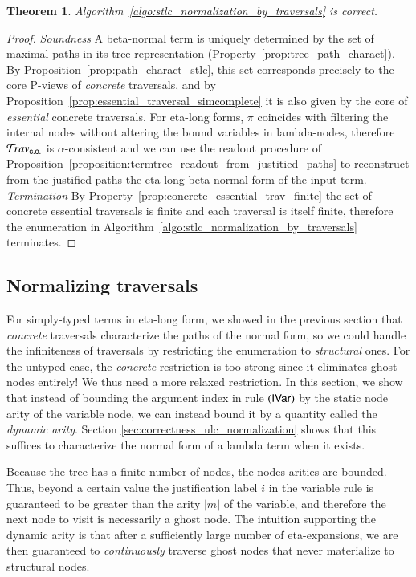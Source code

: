 \documentclass{elsarticle}
\newif\iflongversion
\theoremstyle{plain}
\newtheorem{theorem}{Theorem}[section]
\theoremstyle{definition}
\newcommand{\ghostvar}{\mathsf{x\mkern-5mu x}}
\newcommand{\concreteessential}{{\sf c.e.}}
\newcommand{\travsetcones}{\travset_\concreteessential} %
\def\coresymbol{\pi} %
\begin{document}
\begin{theorem}
Algorithm~\ref{algo:stlc_normalization_by_traversals} is correct.
\end{theorem}
\begin{proof}
\emph{Soundness} A beta-normal term is uniquely determined by the set of maximal paths in its tree representation (Property~\ref{prop:tree_path_charact}).
By Proposition~\ref{prop:path_charact_stlc}, this set corresponds precisely to the core P-views of \emph{concrete} traversals,
and by Proposition~\ref{prop:essential_traversal_simcomplete} it is also given by the core of \emph{essential} concrete traversals.
For eta-long forms, $\coresymbol$ coincides with filtering the internal nodes without altering the bound variables in lambda-nodes, therefore $\travsetcones$ is $\alpha$-consistent and we can use the
readout procedure of Proposition~\ref{proposition:termtree_readout_from_justitied_paths} to reconstruct
from the justified paths the
eta-long beta-normal form of the input term.
%
\emph{Termination} By Property~\ref{prop:concrete_essential_trav_finite} the set of concrete essential traversals is finite and each traversal is itself finite, therefore the enumeration in Algorithm~\ref{algo:stlc_normalization_by_traversals} terminates.
\end{proof}

\subsection{Normalizing traversals}

For simply-typed terms in eta-long form,
we showed in the previous section that \emph{concrete} traversals
characterize the paths of the normal form,
so we could handle the infiniteness of traversals
by restricting the enumeration to \emph{structural} ones.
For the untyped case, the \emph{concrete} restriction
is too strong since it eliminates ghost nodes entirely! We thus need a more relaxed restriction.
In this section, we show that instead of bounding
the argument index in rule $\mathbf{({\sf IVar})}$ by the static node arity of the variable node, we can instead bound it by
a quantity called the \emph{dynamic arity}.
Section \ref{sec:correctness_ulc_normalization} shows that this suffices to characterize the normal form of a lambda term when it exists.

Because the tree has a finite number of nodes, the nodes arities are bounded. Thus, beyond a certain value the
justification label $i$ in the variable rule
  is guaranteed to be greater than the arity $|m|$ of the variable, and therefore the next node to visit is necessarily a ghost node. The intuition supporting the dynamic arity is that after a sufficiently large number of eta-expansions, we are then guaranteed to \emph{continuously} traverse ghost nodes that never materialize to structural nodes.
\iflongversion
 In other words, any further extension will necessarily be constructed using repeated applications of \rulenamet{Lam^\ghostvar} and the eta-expanded variants of \rulenamet{Var}, and will thus consists only of ghost occurrences.
\fi
\end{document}
